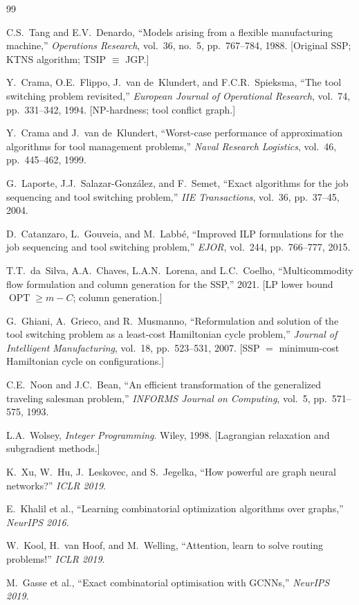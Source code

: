 \documentclass[11pt,a4paper]{article}
\theoremstyle{plain}
\theoremstyle{definition}
\DeclareMathOperator{\OPT}{OPT}
\begin{document}
\begin{thebibliography}{99}

C.S.~Tang and E.V.~Denardo, ``Models arising from a flexible manufacturing machine,''
\textit{Operations Research}, vol.~36, no.~5, pp.~767--784, 1988.
[Original SSP; KTNS algorithm; TSIP $\equiv$ JGP.]

Y.~Crama, O.E.~Flippo, J.~van de~Klundert, and F.C.R.~Spieksma,
``The tool switching problem revisited,''
\textit{European Journal of Operational Research}, vol.~74, pp.~331--342, 1994.
[NP-hardness; tool conflict graph.]

Y.~Crama and J.~van de~Klundert,
``Worst-case performance of approximation algorithms for tool management problems,''
\textit{Naval Research Logistics}, vol.~46, pp.~445--462, 1999.

G.~Laporte, J.J.~Salazar-Gonz\'alez, and F.~Semet,
``Exact algorithms for the job sequencing and tool switching problem,''
\textit{IIE Transactions}, vol.~36, pp.~37--45, 2004.

D.~Catanzaro, L.~Gouveia, and M.~Labb\'e,
``Improved ILP formulations for the job sequencing and tool switching problem,''
\textit{EJOR}, vol.~244, pp.~766--777, 2015.

T.T.~da~Silva, A.A.~Chaves, L.A.N.~Lorena, and L.C.~Coelho,
``Multicommodity flow formulation and column generation for the SSP,'' 2021.
[LP lower bound $\OPT\ge m-C$; column generation.]

G.~Ghiani, A.~Grieco, and R.~Musmanno,
``Reformulation and solution of the tool switching problem as a least-cost
Hamiltonian cycle problem,''
\textit{Journal of Intelligent Manufacturing}, vol.~18, pp.~523--531, 2007.
[SSP $=$ minimum-cost Hamiltonian cycle on configurations.]

C.E.~Noon and J.C.~Bean,
``An efficient transformation of the generalized traveling salesman problem,''
\textit{INFORMS Journal on Computing}, vol.~5, pp.~571--575, 1993.

L.A.~Wolsey, \textit{Integer Programming}. Wiley, 1998.
[Lagrangian relaxation and subgradient methods.]

K.~Xu, W.~Hu, J.~Leskovec, and S.~Jegelka,
``How powerful are graph neural networks?'' \textit{ICLR 2019}.

E.~Khalil et al., ``Learning combinatorial optimization algorithms over graphs,''
\textit{NeurIPS 2016}.

W.~Kool, H.~van Hoof, and M.~Welling,
``Attention, learn to solve routing problems!'' \textit{ICLR 2019}.

M.~Gasse et al., ``Exact combinatorial optimisation with GCNNs,'' \textit{NeurIPS 2019}.

\end{thebibliography}
\end{document}
